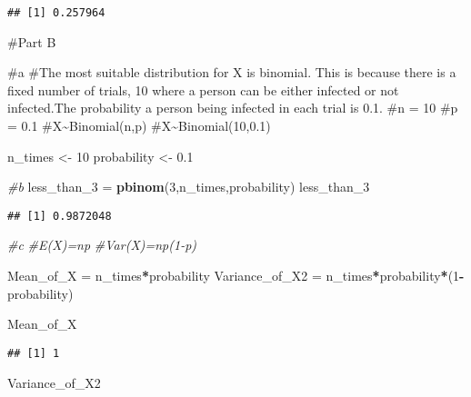 \documentclass[
]{article}
\newenvironment{Shaded}{\begin{snugshade}}{\end{snugshade}}
\newcommand{\CommentTok}[1]{\textcolor[rgb]{0.56,0.35,0.01}{\textit{#1}}}
\newcommand{\DecValTok}[1]{\textcolor[rgb]{0.00,0.00,0.81}{#1}}
\newcommand{\FloatTok}[1]{\textcolor[rgb]{0.00,0.00,0.81}{#1}}
\newcommand{\FunctionTok}[1]{\textcolor[rgb]{0.13,0.29,0.53}{\textbf{#1}}}
\newcommand{\NormalTok}[1]{#1}
\newcommand{\OtherTok}[1]{\textcolor[rgb]{0.56,0.35,0.01}{#1}}
\newcommand{\SpecialCharTok}[1]{\textcolor[rgb]{0.81,0.36,0.00}{\textbf{#1}}}
\begin{document}
\begin{verbatim}
## [1] 0.257964
\end{verbatim}

\#Part B

\#a \#The most suitable distribution for X is binomial. This is because
there is a fixed number of trials, 10 where a person can be either
infected or not infected.The probability a person being infected in each
trial is 0.1. \#n = 10 \#p = 0.1 \#X\textasciitilde Binomial(n,p)
\#X\textasciitilde Binomial(10,0.1)

\begin{Shaded}
\begin{Highlighting}[]
\NormalTok{n\_times }\OtherTok{\textless{}{-}} \DecValTok{10}
\NormalTok{probability }\OtherTok{\textless{}{-}} \FloatTok{0.1}
\end{Highlighting}
\end{Shaded}

\begin{Shaded}
\begin{Highlighting}[]
\CommentTok{\#b}
\NormalTok{less\_than\_3 }\OtherTok{=} \FunctionTok{pbinom}\NormalTok{(}\DecValTok{3}\NormalTok{,n\_times,probability)}
\NormalTok{less\_than\_3}
\end{Highlighting}
\end{Shaded}

\begin{verbatim}
## [1] 0.9872048
\end{verbatim}

\begin{Shaded}
\begin{Highlighting}[]
\CommentTok{\#c}
\CommentTok{\#E(X)=np}
\CommentTok{\#Var(X)=np(1{-}p)}

\NormalTok{Mean\_of\_X }\OtherTok{=}\NormalTok{ n\_times}\SpecialCharTok{*}\NormalTok{probability}
\NormalTok{Variance\_of\_X2 }\OtherTok{=}\NormalTok{ n\_times}\SpecialCharTok{*}\NormalTok{probability}\SpecialCharTok{*}\NormalTok{(}\DecValTok{1}\SpecialCharTok{{-}}\NormalTok{probability)}

\NormalTok{Mean\_of\_X}
\end{Highlighting}
\end{Shaded}

\begin{verbatim}
## [1] 1
\end{verbatim}

\begin{Shaded}
\begin{Highlighting}[]
\NormalTok{Variance\_of\_X2}
\end{Highlighting}
\end{Shaded}
\end{document}
